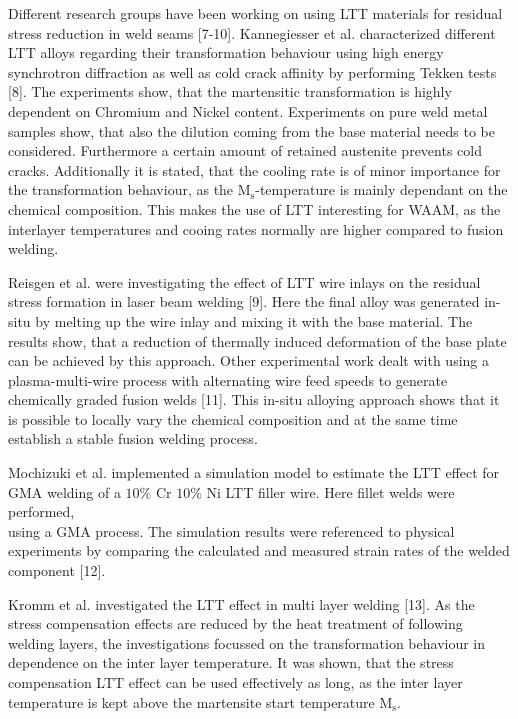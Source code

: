 \documentclass[10pt]{article}
\begin{document}
Different research groups have been working on using LTT materials for residual stress reduction in weld seams [7-10]. Kannegiesser et al. characterized different LTT alloys regarding their transformation behaviour using high energy synchrotron diffraction as well as cold crack affinity by performing Tekken tests [8]. The experiments show, that the martensitic transformation is highly dependent on Chromium and Nickel content. Experiments on pure weld metal samples show, that also the dilution coming from the base material needs to be considered. Furthermore a certain amount of retained austenite prevents cold cracks. Additionally it is stated, that the cooling rate is of minor importance for the transformation behaviour, as the $\mathrm{M}_{\mathrm{s}}$-temperature is mainly dependant on the chemical composition. This makes the use of LTT interesting for WAAM, as the interlayer temperatures and cooing rates normally are higher compared to fusion welding.

Reisgen et al. were investigating the effect of LTT wire inlays on the residual stress formation in laser beam welding [9]. Here the final alloy was generated in-situ by melting up the wire inlay and mixing it with the base material. The results show, that a reduction of thermally induced deformation of the base plate can be achieved by this approach. Other experimental work dealt with using a plasma-multi-wire process with alternating wire feed speeds to generate chemically graded fusion welds [11]. This in-situ alloying approach shows that it is possible to locally vary the chemical composition and at the same time establish a stable fusion welding process.

Mochizuki et al. implemented a simulation model to estimate the LTT effect for GMA welding of a $10 \%$ Cr $10 \%$ Ni LTT filler wire. Here fillet welds were performed,\\
using a GMA process. The simulation results were referenced to physical experiments by comparing the calculated and measured strain rates of the welded component [12].

Kromm et al. investigated the LTT effect in multi layer welding [13]. As the stress compensation effects are reduced by the heat treatment of following welding layers, the investigations focussed on the transformation behaviour in dependence on the inter layer temperature. It was shown, that the stress compensation LTT effect can be used effectively as long, as the inter layer temperature is kept above the martensite start temperature $\mathrm{M}_{\mathrm{s}}$.
\end{document}
